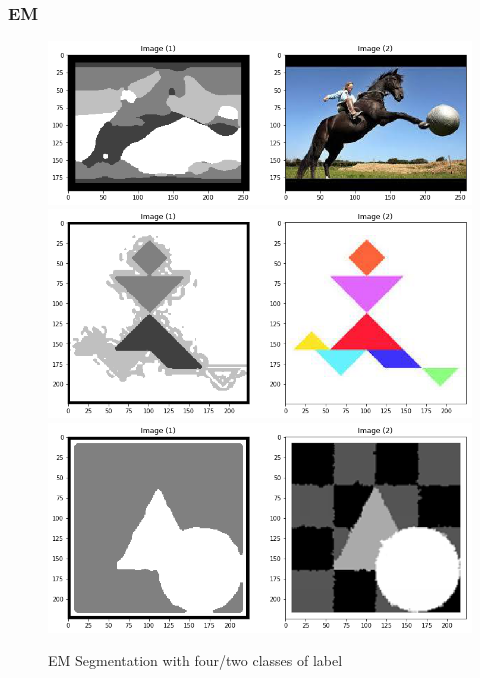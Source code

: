\documentclass{beamer}
\begin{document}
\begin{frame}
\frametitle{EM}
\begin{figure}\label{fg:1}
\begin{center}
\includegraphics[width=.4\linewidth]{horse_result.png}
\\[\baselineskip]%
\includegraphics[width=.4\linewidth]{person_result.png}
\\[\baselineskip]%
\includegraphics[width=.4\linewidth]{circle_result.png}
\\[\baselineskip]%
\caption{EM Segmentation with four/two classes of label}
\end{center}
\end{figure}
\end{frame}










%
%
%
%



\end{document}
